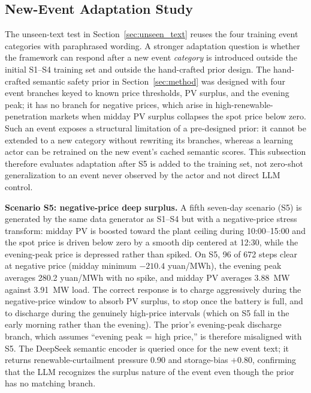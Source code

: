 \documentclass{ieeeaccess}
\begin{document}
\subsection{New-Event Adaptation Study}
\label{sec:unseen_event}
The unseen-text test in Section~\ref{sec:unseen_text} reuses the four training event categories with paraphrased wording. A stronger adaptation question is whether the framework can respond after a new event \emph{category} is introduced outside the initial S1--S4 training set and outside the hand-crafted prior design. The hand-crafted semantic safety prior in Section~\ref{sec:method} was designed with four event branches keyed to known price thresholds, PV surplus, and the evening peak; it has no branch for negative prices, which arise in high-renewable-penetration markets when midday PV surplus collapses the spot price below zero. Such an event exposes a structural limitation of a pre-designed prior: it cannot be extended to a new category without rewriting its branches, whereas a learning actor can be retrained on the new event's cached semantic scores. This subsection therefore evaluates adaptation after S5 is added to the training set, not zero-shot generalization to an event never observed by the actor and not direct LLM control.

\textbf{Scenario S5: negative-price deep surplus.} A fifth seven-day scenario (S5) is generated by the same data generator as S1--S4 but with a negative-price stress transform: midday PV is boosted toward the plant ceiling during 10:00--15:00 and the spot price is driven below zero by a smooth dip centered at 12:30, while the evening-peak price is depressed rather than spiked. On S5, 96 of 672 steps clear at negative price (midday minimum $-210.4$ yuan/MWh), the evening peak averages 280.2 yuan/MWh with no spike, and midday PV averages 3.88~MW against 3.91~MW load. The correct response is to charge aggressively during the negative-price window to absorb PV surplus, to stop once the battery is full, and to discharge during the genuinely high-price intervals (which on S5 fall in the early morning rather than the evening). The prior's evening-peak discharge branch, which assumes ``evening peak = high price,'' is therefore misaligned with S5. The DeepSeek semantic encoder is queried once for the new event text; it returns renewable-curtailment pressure 0.90 and storage-bias $+0.80$, confirming that the LLM recognizes the surplus nature of the event even though the prior has no matching branch.
\end{document}
